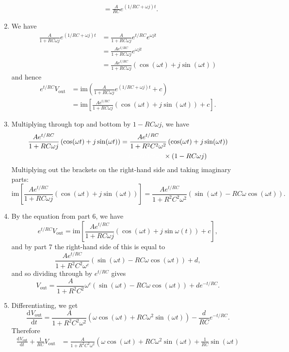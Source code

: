 \documentclass{article}
\newcommand{\deriv}[3][]{\frac{\mathrm{d}^{#1} #2}{\mathrm{d}#3^{#1}}}
\begin{document}
\begin{enumerate}
\begin{align*}
			&=\frac{A}{RC}e^{(1/RC+\omega j)t}.
		\end{align*}
	\item We have
		\begin{align*}
			\frac{A}{1+RC\omega j}e^{(1/RC+\omega j)t}&=\frac{A}{1+RC\omega j}e^{t/RC}e^{\omega jt}\\
			&=\frac{Ae^{t/RC}}{1+RC\omega j}e^{\omega jt}\\
			&=\frac{Ae^{t/RC}}{1+RC\omega j}\left(\cos(\omega t)+j\sin(\omega t)\right)
		\end{align*}
		and hence
		\begin{align*}
			e^{t/RC} V_\mathrm{out} &= \mathrm{im}\left(\frac{A}{1+RC\omega j}e^{(1/RC+ \omega j)t}+c\right)\\
			&=\mathrm{im}\left[\frac{Ae^{t/RC}}{1+RC\omega j}\left(\cos(\omega t)+j\sin(\omega t)\right)+c\right].
		\end{align*}
	\item Multiplying through top and bottom by $1-RC\omega j$, we have
		\begin{align*}
			\frac{Ae^{t/RC}}{1+RC\omega j}\left(\cos(\omega t)+j\sin(\omega t)\right) &=\frac{Ae^{t/RC}}{1+R^2C^2\omega^2}\left(\cos(\omega t)+j\sin(\omega t)\right)\\
			&{\color{white} =1+R^2C^2\omega^2}\times (1-RC\omega j)
		\end{align*}
		Multiplying out the brackets on the right-hand side and taking imaginary parts:
		\[\mathrm{im}\left[\frac{Ae^{t/RC}}{1+RC\omega j}\left(\cos(\omega t)+j\sin(\omega t)\right)\right] = \frac{Ae^{t/RC}}{1+R^2C^2\omega^2}\left(\sin(\omega t)-RC\omega \cos(\omega t)\right).\]
	\item By the equation from part 6, we have
		\[e^{t/RC}V_\mathrm{out} = \mathrm{im}\left[\frac{Ae^{t/RC}}{1+RC\omega j}\left(\cos(\omega t)+j\sin\omega(t)\right)+c\right],\]
		and by part 7 the right-hand side of this is equal to
		\[\frac{Ae^{t/RC}}{1+R^2C^2\omega^c}\left(\sin(\omega t)-RC\omega\cos(\omega t)\right)+ d,\]
		and so dividing through by $e^{t/RC}$ gives
		\[V_\mathrm{out}=\frac{A}{1+R^2C^2}\omega^c\left(\sin(\omega t)-RC\omega\cos(\omega t)\right)+de^{-t/RC}.\]
	\item Differentiating, we get
		\[\deriv{V_\mathrm{out}}{t}=\frac{A}{1+R^2C^2\omega^2}\left(\omega\cos(\omega t)+RC\omega^2\sin(\omega t)\right) -\frac{d}{RC}e^{-t/RC}.\]
		Therefore
		\begin{align*}
			\deriv{V_\mathrm{out}}{t}+\frac{1}{RC}V_\mathrm{out}&= \frac{A}{1+R^2C^2\omega^2}\left(\omega\cos(\omega t) + RC\omega^2\sin(\omega t) + \frac{1}{RC}\sin(\omega t)\right.\\

\end{align*}
\end{enumerate}
\end{document}
